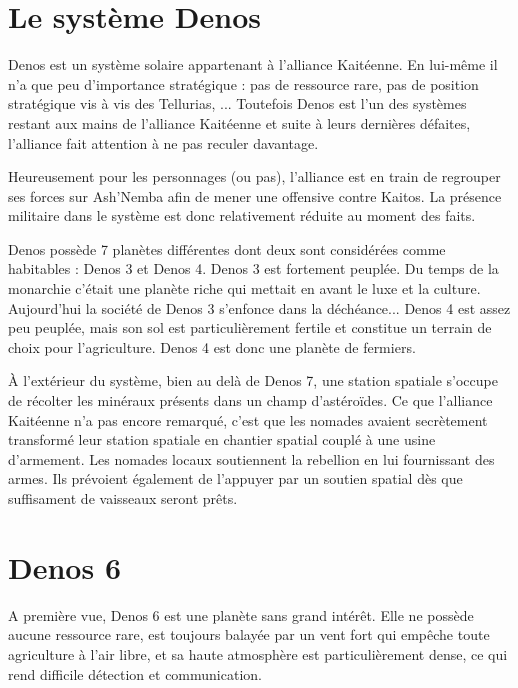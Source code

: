 \begin{multicols}{2}

\section{Le système Denos}

Denos est un système solaire appartenant à l'alliance Kaitéenne. En lui-même il n'a que peu d'importance stratégique : pas de ressource rare, pas de position stratégique vis à vis des Tellurias, ... Toutefois Denos est l'un des systèmes restant aux mains de l'alliance Kaitéenne et suite à leurs dernières défaites, l'alliance fait attention à ne pas reculer davantage. 

Heureusement pour les personnages (ou pas), l'alliance est en train de regrouper ses forces sur Ash'Nemba afin de mener une offensive contre Kaitos. La présence militaire dans le système est donc relativement réduite au moment des faits.

Denos possède 7 planètes différentes dont deux sont considérées comme habitables : Denos 3 et Denos 4. Denos 3 est fortement peuplée. Du temps de la monarchie c'était une planète riche qui mettait en avant le luxe et la culture. Aujourd'hui la société de Denos 3 s'enfonce dans la déchéance... Denos 4 est assez peu peuplée, mais son sol est particulièrement fertile et constitue un terrain de choix pour l'agriculture. Denos 4 est donc une planète de fermiers.

À l'extérieur du système, bien au delà de Denos 7, une station spatiale s'occupe de récolter les minéraux présents dans un champ d'astéroïdes. Ce que l'alliance Kaitéenne n'a pas encore remarqué, c'est que les nomades avaient secrètement transformé leur station spatiale en chantier spatial couplé à une usine d'armement. Les nomades locaux soutiennent la rebellion en lui fournissant des armes. Ils prévoient également de l'appuyer par un soutien spatial dès que suffisament de vaisseaux seront prêts.

\section{Denos 6}

A première vue, Denos 6 est une planète sans grand intérêt. Elle ne possède aucune ressource rare, est toujours balayée par un vent fort qui empêche toute agriculture à l'air libre, et sa haute atmosphère est particulièrement dense, ce qui rend difficile détection et communication.


\end{multicols}
